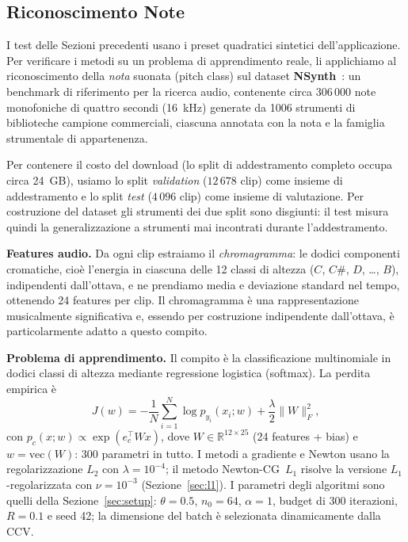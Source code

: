\documentclass[a4paper,12pt]{article}
\numberwithin{equation}{section}
\numberwithin{figure}{section}
\numberwithin{table}{section}
\begin{document}
\makeatletter
\def\@currentlabel{5.3}\label{sec:l1}
\def\@currentlabel{6.1}\label{sec:setup}
\makeatother

\subsection{Riconoscimento Note}\label{sec:nsynth}

I test delle Sezioni precedenti usano i preset quadratici sintetici
dell'applicazione. Per verificare i metodi su un problema di apprendimento
reale, li applichiamo al riconoscimento della \emph{nota} suonata (pitch
class) sul dataset \textbf{NSynth}~\cite{engel2017}: un benchmark di
riferimento per la ricerca audio, contenente circa $306\,000$ note
monofoniche di quattro secondi (16~kHz) generate da 1006 strumenti di
biblioteche campione commerciali, ciascuna annotata con la nota e la famiglia
strumentale di appartenenza.

Per contenere il costo del download (lo split di addestramento completo
occupa circa 24~GB), usiamo lo split \emph{validation} ($12\,678$ clip) come
insieme di addestramento e lo split \emph{test} ($4\,096$ clip) come insieme
di valutazione. Per costruzione del dataset gli strumenti dei due split sono
disgiunti: il test misura quindi la generalizzazione a strumenti mai
incontrati durante l'addestramento.

\textbf{Features audio.} Da ogni clip estraiamo il \emph{chromagramma}: le
dodici componenti cromatiche, cioè l'energia in ciascuna delle 12 classi di
altezza ($C$, $C\#$, $D$, \dots, $B$), indipendenti dall'ottava, e ne
prendiamo media e deviazione standard nel tempo, ottenendo 24 features per
clip. Il chromagramma è una rappresentazione musicalmente significativa e,
essendo per costruzione indipendente dall'ottava, è particolarmente adatto a
questo compito.

\textbf{Problema di apprendimento.} Il compito è la classificazione
multinomiale in dodici classi di altezza mediante regressione logistica
(softmax). La perdita empirica è
\[
  J(w) = -\frac{1}{N}\sum_{i=1}^{N}\log p_{y_i}(x_i; w)
         + \frac{\lambda}{2}\|W\|_F^2,
\]
con $p_c(x; w) \propto \exp(e_c^{\top} W x)$, dove $W \in \mathbb{R}^{12\times 25}$
(24 features + bias) e $w = \mathrm{vec}(W)$: 300 parametri in tutto. I metodi
a gradiente e Newton usano la regolarizzazione $L_2$ con $\lambda = 10^{-4}$;
il metodo Newton-CG~$L_1$ risolve la versione $L_1$-regolarizzata con
$\nu = 10^{-3}$ (Sezione~\ref{sec:l1}). I parametri degli algoritmi sono
quelli della Sezione~\ref{sec:setup}: $\theta = 0.5$, $n_0 = 64$, $\alpha = 1$,
budget di 300 iterazioni, $R = 0.1$ e seed 42; la dimensione del batch è
selezionata dinamicamente dalla CCV.
\end{document}

